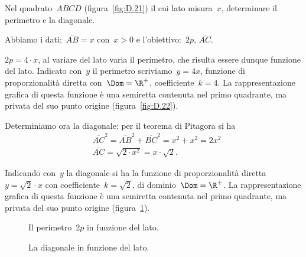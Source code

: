 \begin{problema}
\label{ex:D.21}
Nel quadrato~\(ABCD\) (figura~\ref{fig:D.21}) il cui lato misura~\(x\), 
determinare 
il perimetro e la diagonale.
\end{problema}
\begin{soluzione}
 Abbiamo i dati:~\(\overline{AB}=x\) con~\(x>0\) e l'obiettivo:~\(2p\), 
\(\overline{AC}\).

 \(2p=4\cdot x\), al variare del lato varia il perimetro, che risulta essere 
dunque funzione del lato.
Indicato con~\(y\) il perimetro scriviamo~\(y=4x\), funzione di 
proporzionalità 
diretta con~\(\Dom=\R^{+}\),
coefficiente~\(k=4\). La rappresentazione grafica di questa funzione è una 
semiretta contenuta nel primo quadrante,
ma privata del suo punto origine (figura~\ref{fig:D.22}).

Determiniamo ora la diagonale: per il teorema di Pitagora si ha
\begin{align*}
 &\overline{AC}^{2}=\overline{AB}^{2}+\overline{BC}^{2}=x^{2}+x^{2}=2x^{2}\\
 &\overline{AC}=\sqrt{2\cdot x^{2}}=x\cdot \sqrt{2}.
\end{align*}

Indicando con~\(y\) la diagonale si ha la funzione di proporzionalità 
diretta~\(y=\sqrt{2}\cdot x\)
con coefficiente~\(k=\sqrt{2}\), di dominio~\(\Dom=\R^{+}\).
La rappresentazione grafica di questa funzione è una semiretta contenuta nel 
primo quadrante, ma privata del suo punto origine (figura~\ref{fig:D.23}).
\end{soluzione}

\begin{inaccessibleblock}
 \begin{figure}[h]
 \begin{minipage}[b]{.45\textwidth}
  \centering
  \caption{Il perimetro~\(2p\) in funzione del lato.}\label{fig:D.22}
 \end{minipage}\hfil
 \begin{minipage}[b]{.45\textwidth}
  \centering
  \caption{La diagonale in funzione del lato.}\label{fig:D.23}
 \end{minipage}
\end{figure}
\end{inaccessibleblock}


